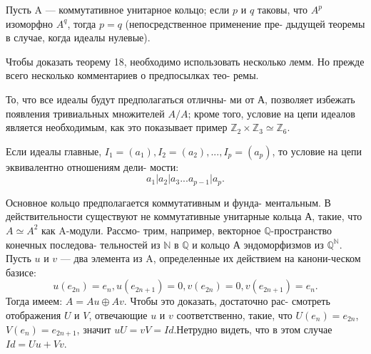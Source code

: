 \documentclass{mai_book}
\begin{document}
\begin{sled}
Пусть A — коммутативное унитарное кольцо; если $p$ и $q$ таковы, \linebreak что $A^p$ изоморфно $A^q$, тогда $p = q$ (непосредственное применение пре- \linebreak дыдущей теоремы в случае, когда идеалы нулевые). 

Чтобы доказать теорему 18, необходимо использовать несколько \linebreak лемм. Но прежде всего несколько комментариев о предпосылках тео- \linebreak ремы.
\end{sled}
\begin{mynotice} То, что все идеалы будут предполагаться отличны- \linebreak ми от А, позволяет избежать появления тривиальных множителей \linebreak $A/A$; кроме того, условие на цепи идеалов является необходимым, \linebreak как это показывает пример $\mathbb{Z}_2 \times \mathbb{Z}_3 \simeq \mathbb{Z}_6$. 

Если идеалы главные, $I_1 = (a_1), I_2 = (a_2), ...,$\linebreak $I_p = (a_p)$, то условие на цепи эквивалентно отношениям дели- \linebreak мости:
$$a_1 | a_2 | a_3 ... a_{p-1} | a_p.$$ 

Основное кольцо предполагается коммутативным и фунда- \linebreak ментальным. В действительности существуют не коммутативные \linebreak унитарные кольца А, такие, что $A \simeq A^2$ как A-модули. Рассмо- \linebreak трим, например, векторное $\mathbb{Q}$-пространство конечных последова- \linebreak тельностей из $\mathbb{N}$ в $\mathbb{Q}$ и кольцо А эндоморфизмов из $\mathbb{Q}^{\mathbb{N}}$. Пусть $u$ \linebreak и $v$ — два элемента из A, определенные их действием на канони-\linebreak ческом базисе: 
$$u(e_{2n}) = e_n, u(e_{2n+1}) = 0, v(e_{2n}) = 0, v(e_{2n+1}) = e_n.$$
Тогда имеем: $A = Au \oplus Av$. Чтобы это доказать, достаточно рас- \linebreak смотреть отображения $U$ и $V$, отвечающие $u$ и $v$ соответственно, \linebreak такие, что $U(e_n) = e_{2n}$, $V(e_n) = e_{2n + 1}$, значит $uU = vV = Id$.\linebreak Нетрудно видеть, что в этом случае $Id = Uu + Vv$.
\end{mynotice}
\end{document}
